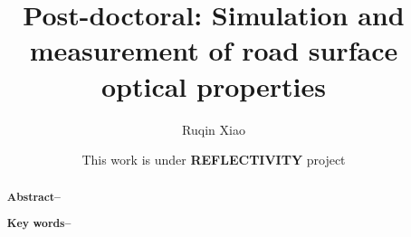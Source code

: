 \documentclass[12pt]{report}
\title{Post-doctoral: Simulation and measurement of road surface optical properties}
\author{Ruqin Xiao}
\date{This work is under \textbf{REFLECTIVITY} project}
\begin{document}
\maketitle
\begin{abstract}

    \textbf{Abstract--}



    \textbf{Key words--}
\end{abstract}

\tableofcontents















 

\end{document}
